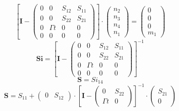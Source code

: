 \[ \left[ \mathbf{I}  - \left(\begin{smallmatrix} 0 & 0 & S_{12} & S_{11} \\ 0 & 0 & S_{22} & S_{21} \\ 0 & \Gamma t & 0 & 0 \\ 0 & 0 & 0 & 0 \end{smallmatrix}\right)\right] \cdot \left(\begin{smallmatrix} n_{2} \\ n_{3} \\ n_{4} \\ n_{1} \end{smallmatrix}\right) = \left(\begin{smallmatrix} 0 \\ 0 \\ 0 \\ m_{1} \end{smallmatrix}\right) \]
\[ \mathbf{Si} = \left[ \mathbf{I}  - \left(\begin{smallmatrix} 0 & 0 & S_{12} & S_{11} \\ 0 & 0 & S_{22} & S_{21} \\ 0 & \Gamma t & 0 & 0 \\ 0 & 0 & 0 & 0 \end{smallmatrix}\right) \right]^{-1} \]
\[ \mathbf{S} = Si_{14} \]
\[ \mathbf{S} = S_{11} + \left(\begin{smallmatrix} 0 & S_{12} \end{smallmatrix}\right) \cdot \left[ \mathbf{I}  - \left(\begin{smallmatrix} 0 & S_{22} \\ \Gamma t & 0 \end{smallmatrix}\right) \right]^{-1} \cdot\left(\begin{smallmatrix} S_{21} \\ 0 \end{smallmatrix}\right) \]
